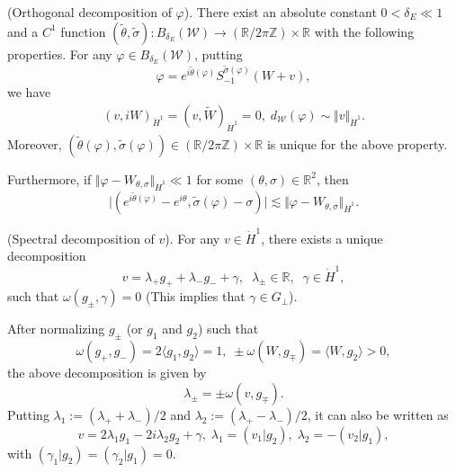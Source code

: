 \documentclass[10pt,a4paper]{amsart}
\newcommand{\R}{\mathbb{R}}
\newcommand{\Z}{{\mathbb{Z}}}
\begin{document}
	\begin{proposition}(Orthogonal decomposition of $\varphi$)\label{prop:orth decom}. There exist an absolute constant $0<\delta_E\ll1$ and a $C^1$ function $\left(\widetilde{\theta},\widetilde{\sigma} \right):B_{\delta_E}(\mathcal{W}) \rightarrow (\R/2\pi\Z)\times \R$ with the following properties. For any $\varphi\in B_{\delta_E}(\mathcal{W})$, putting 
		\begin{equation}\label{decom:var}
		\varphi=e^{i\widetilde{\theta}(\varphi)}S_{-1}^{\widetilde{\sigma}(\varphi)}(W+v),
		\end{equation}	
		we have 
		\begin{equation*}
		\begin{aligned}
		(v,iW)_{\dot H^1}=(v,\widetilde{W})_{\dot H^1}=0, \; d_{\mathcal{W}}(\varphi)\sim \Vert v\Vert_{\dot H^1}.
		\end{aligned}
		\end{equation*}
		Moreover, $\left(\widetilde{\theta}(\varphi),\widetilde{\sigma} (\varphi)\right) \in  (\R/2\pi\Z)\times \R$ is unique for the above property. 
		
		Furthermore, if $\Vert \varphi-W_{\theta,\sigma}\Vert_{\dot H^1} \ll 1$ for some $(\theta,\sigma)\in\R^2$, then 
		\begin{equation*}
		\big|\left(e^{i\widetilde{\theta}(\varphi)}-e^{i\theta}, \widetilde{\sigma}(\varphi)-\sigma \right)\big|\lesssim \Vert \varphi-W_{\theta,\sigma}\Vert_{\dot H^1}.
		\end{equation*}
	\end{proposition}

	\begin{proposition}(Spectral decomposition of $v$)\label{prop:spect decom}. For any $v \in \dot H^1$, there exists a unique decomposition
		\begin{equation}\label{decom:v+}
		v=\lambda_+g_{+} + \lambda_-g_{-}+\gamma,\;\;\lambda_{\pm}\in\R,\;\;\gamma\in  \dot H^1,
		\end{equation}
		such that $\omega(g_{\pm},\gamma)=0$ (This implies that $\gamma\in G_{\bot}$).
		
		After normalizing $g_{\pm}$ (or $g_1$ and $g_2$) such that 
		\begin{equation}\label{con:ome}
		\omega(g_{+},g_{-})=2\langle g_{1},g_{2} \rangle=1,\; \pm\omega(W,g_{\mp})=\langle W,g_2 \rangle>0,
		\end{equation}
		the above decomposition is given by
		\begin{equation*}
		\lambda_{\pm}=\pm \omega(v,g_{\mp}).
		\end{equation*}
		Putting $\lambda_1:=(\lambda_+ +\lambda_-)/2$ and $\lambda_2:=(\lambda_+ -\lambda_-)/2$, it can also be written as 
		\begin{equation}\label{decom:v1}
		v=2\lambda_{1}g_1-2i\lambda_{2}g_2+\gamma,\; \lambda_1=(v_1|g_2),\; \lambda_2=-(v_2|g_1),
		\end{equation}
		with $(\gamma_1|g_2)=(\gamma_2|g_1)=0$.
	\end{proposition}
\end{document}
